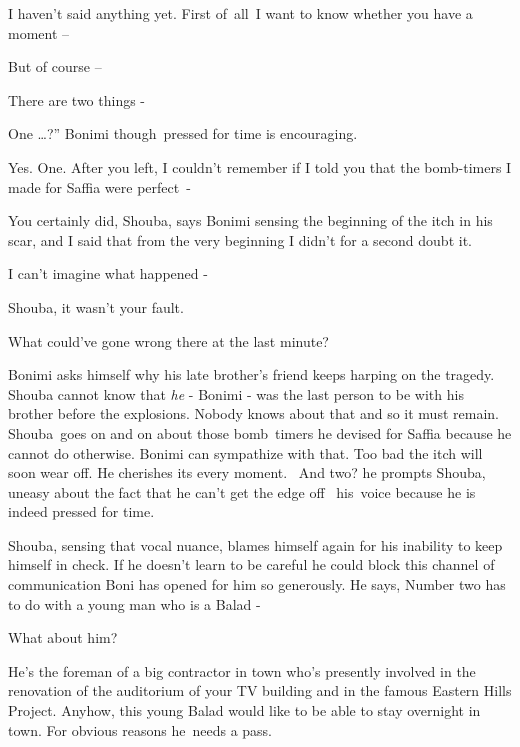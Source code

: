 \documentclass[twoside,11pt]{book}
\begin{document}
{\textquotedbl}I haven't said anything yet. First of\ all\ I want to know whether you have a moment --{\textquotedbl}

{\textquotedbl}But of course --{\textquotedbl} 

{\textquotedbl}There are two things -{\textquotedbl}

{\textquotedbl}One {\dots}?'' Bonimi though~pressed for time is encouraging. 

{\textquotedbl}Yes. One. After you left, I couldn't remember if I told you that the bomb-timers I made for Saffia were
perfect~-{\textquotedbl} 

{\textquotedbl}You certainly did, Shouba,{\textquotedbl} says Bonimi sensing the beginning of the itch in his scar,
{\textquotedbl}and I said that from the very beginning I didn't for a second doubt it.{\textquotedbl}

{\textquotedbl}I can't imagine what happened - {\textquotedbl}

{\textquotedbl}Shouba, it wasn't your fault.{\textquotedbl} 

{\textquotedbl}What could've gone wrong there at the last minute?{\textquotedbl}

Bonimi asks himself why his late brother's friend keeps harping on the tragedy. Shouba cannot know that \textit{he} -
Bonimi - was the last person to be with his brother before the explosions. Nobody knows about that and so it must
remain. Shouba\ goes on and on about those bomb\ timers he devised for Saffia because he cannot do otherwise. Bonimi
can sympathize with that. Too bad the itch will soon wear off. He cherishes its every moment. ~{\textquotedbl}And
two?{\textquotedbl} he prompts Shouba, uneasy about the fact that he can't get the edge off \ his\ voice because he is
indeed pressed for time.\ \ 

Shouba, sensing that vocal nuance, blames himself again for his inability to keep himself in check. If he doesn't learn
to be careful he could block this channel of communication Boni has opened for him so generously. He says,
{\textquotedbl}Number two has to do with a young man who is a Balad -{\textquotedbl}

{\textquotedbl}What about him?{\textquotedbl}

{\textquotedbl}He's the foreman of a big contractor in town who's presently involved in the renovation of the auditorium
of your TV building and in the famous Eastern Hills Project. Anyhow, this young Balad would like to be able to stay
overnight in town. For obvious reasons he~needs a pass.{\textquotedbl}
\end{document}
